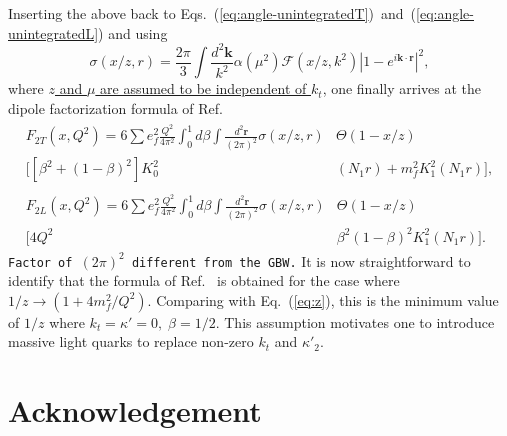 \documentclass[11pt]{article}
\numberwithin{equation}{section}
\numberwithin{table}{section}
\numberwithin{figure}{section}
\newcommand{\comment}[1]{\texttt{\color{red}#1}}
\begin{document}
Inserting the above back to Eqs.~(\ref{eq:angle-unintegratedT})~and~(\ref{eq:angle-unintegratedL}) and using 
\begin{equation}
	\sigma(x/z,r)=\frac{2\pi}{3}\int\frac{d^2\mathbf{k}}{k^2}\alpha(\mu^2)\mathcal{F}(x/z,k^2)\left|1-e^{i \mathbf{k}\cdot\mathbf{r}}\right|^2,
\end{equation}
where \underline{$z$ and $\mu$ are assumed to be independent of $k_t$},
one finally arrives at the dipole factorization formula of Ref.~\cite{Golec-Biernat:1998zce}
\begin{align}
	\begin{split}
		F_{2T}(x,Q^2)=6\sum e^2_f\frac{Q^2}{4\pi^2}\int^1_0 d\beta\int\frac{d^2\mathbf{r}}{(2\pi)^2}
		\sigma(x/z,r)
		&\Theta(1-x/z)\\
		\Big[
		\left[\beta^2+(1-\beta)^2\right]
		K_0^2&(N_1 r)
		+m_f^2
		K_1^2(N_1 r)
		\Big],
	\end{split}\\
	\begin{split}
		F_{2L}(x,Q^2)=6\sum e^2_f\frac{Q^2}{4\pi^2}\int^1_0 d\beta \int\frac{d^2\mathbf{r}}{(2\pi)^2}
		\sigma(x/z,r)
		&\Theta(1-x/z)\\
		\Big[
		4Q^2&\beta^2 (1-\beta)^2
		K_1^2(N_1 r)
		\Big].
	\end{split}
\end{align}
\comment{Factor of $(2\pi)^2$ different from the GBW.}
It is now straightforward to identify that the formula of Ref.~\cite{Golec-Biernat:1998zce} is obtained for the case where $ 1/z\rightarrow\left(1+4 m_f^2/Q^2\right)$.
Comparing with Eq.~(\ref{eq:z}), this is the minimum value of $1/z$ where $k_t={\kappa'}=0,\;\beta=1/2$. This assumption motivates one to introduce massive light quarks to replace non-zero $k_t$ and $\kappa'_2$.
\section*{Acknowledgement}

\clearpage
%
\printbibliography

% 

%
\end{document}
